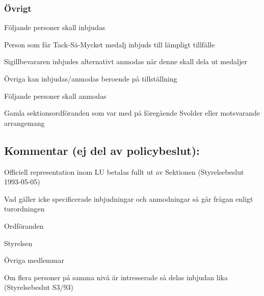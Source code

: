 \documentclass[10pt]{article}
\begin{document}
\subsubsection*{Övrigt}
Följande personer skall inbjudas
\begin{dashlist}
\item Person som får Tack-Så-Mycket medalj inbjuds till lämpligt tillfälle
\item Sigillbevararen inbjudes alternativt anmodas när denne skall dela ut
medaljer
\item Övriga kan inbjudas/anmodas beroende på tillställning
\end{dashlist}
Följande personer skall anmodas
\begin{dashlist}
\item Gamla sektionsordföranden som var med på föregående Svolder eller
motsvarande arrangemang
\end{dashlist}


\newpage
\subsection*{Kommentar (ej del av policybeslut):}
\begin{dashlist}
\item Officiell representation inom LU betalas fullt ut av Sektionen
(Styrelsebeslut 1993-05-05)
\item Vad gäller icke specificerade inbjudningar och anmodningar så går
frågan enligt turordningen
\begin{numplist}
\item Ordföranden
\item Styrelsen
\item Övriga medlemmar
\end{numplist}
\item Om flera personer på samma nivå är intresserade så delas inbjudan lika
(Styrelsebeslut S3/93)
\end{dashlist}
\end{document}
